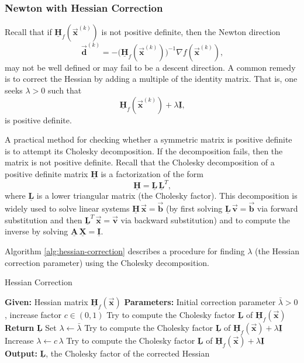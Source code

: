 \documentclass[9pt, headings=standardclasses, parskip=half]{scrartcl}
\renewcommand{\emph}[1]{\textcolor{mypurple}{#1}}
\newcommand{\matr}[1]{\underline{\boldsymbol{#1}}}
\newcommand{\vect}[1]{\vec{\boldsymbol{#1}}}
\begin{document}

\subsubsection{Newton with Hessian Correction}

Recall that if 
\(
\matr{H}_{f}(\vect{x}^{(k)}) 
\)
is not positive definite, then the Newton direction
\[
\vect{d}^{(k)} = -\big(\matr{H}_{f}(\vect{x}^{(k)})\big)^{-1}\nabla f(\vect{x}^{(k)}) \text{,}
\]
may not be well defined or may fail to be a descent direction. A common remedy is to \emph{correct} the Hessian by adding a multiple of the identity matrix. That is, one seeks \(\lambda > 0\) such that
\[
\matr{H}_{f}(\vect{x}^{(k)}) + \lambda \matr{I} \text{,}
\]
is positive definite.

A practical method for checking whether a symmetric matrix is positive definite is to attempt its Cholesky decomposition. %
If the decomposition fails, then the matrix is not positive definite. 
Recall that the Cholesky decomposition of a positive definite matrix \(\matr{H}\) is a factorization of the form
\[
\matr{H} = \matr{L}\,\matr{L}^T \text{,}
\]
where \(\matr{L}\) is a lower triangular matrix (the Cholesky factor). 
This decomposition is widely used to solve linear systems \(\matr{H}\,\vect{x} = \vect{b}\) (by first solving \(\matr{L}\,\vect{v}=\vect{b}\) via forward substitution and then \(\matr{L}^T\,\vect{x}=\vect{v}\) via backward substitution) and to compute the inverse by solving \(\matr{A}\,\matr{X} = \matr{I}\).

Algorithm \ref{alg:hessian-correction} describes a procedure for finding \(\lambda\) (the Hessian correction parameter) using the Cholesky decomposition.

\begin{algorithm}[h]
\caption{Hessian Correction}\label{alg:hessian-correction}
\begin{algorithmic}[1]
    \State \textbf{Given:} Hessian matrix \(\matr{H}_{f}(\vect{x})\)
    \State \textbf{Parameters:} Initial correction parameter \(\bar{\lambda}>0\), increase factor \(c \in (0,1)\)
    \State Try to compute the Cholesky factor \(\matr{L}\) of \(\matr{H}_{f}(\vect{x})\)
        \State \textbf{Return} \(\matr{L}\)
    \EndIf
    \State Set \(\lambda \leftarrow \bar{\lambda}\)
    \State Try to compute the Cholesky factor \(\matr{L}\) of \(\matr{H}_{f}(\vect{x}) + \lambda \matr{I}\)
        \State Increase \(\lambda \leftarrow c\,\lambda\)
        \State Try to compute the Cholesky factor \(\matr{L}\) of \(\matr{H}_{f}(\vect{x}) + \lambda \matr{I}\)
    \EndWhile
    \State \textbf{Output:} \(\matr{L}\), the Cholesky factor of the corrected Hessian %
\end{algorithmic}
\end{algorithm}
\end{document}
